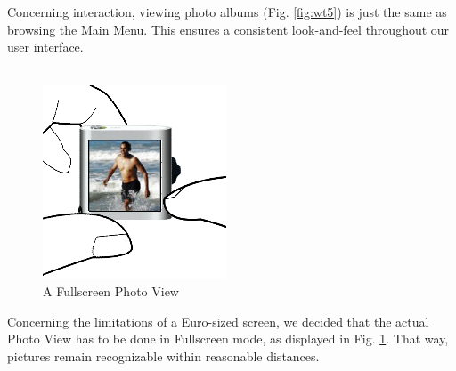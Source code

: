 %
Concerning interaction, viewing photo albums (Fig. \ref{fig:wt5}) is just the same as browsing the Main Menu. This ensures a consistent look-and-feel throughout our user interface.
\\
\\
%
\begin{figure}[h]
  \begin{center}
    \includegraphics[width=0.6\linewidth]{imgs/wt6.png}
  \end{center}
  \caption{A Fullscreen Photo View}
  \label{fig:wt6}
\end{figure}
%
Concerning the limitations of a Euro-sized screen, we decided that the actual Photo View has to be done in Fullscreen mode, as displayed in Fig. \ref{fig:wt6}. That way, pictures remain recognizable within reasonable distances.
\\
\\
%
